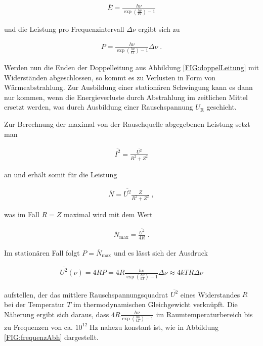 \begin{align}
\overline{E} = \frac{h\nu}{\exp\left( \frac{h\nu}{kT}\right) -1}
\end{align}

und die Leistung pro Frequenzintervall $\Delta\nu$ ergibt sich zu

\begin{align}
P = \frac{h\nu}{\exp\left( \frac{h\nu}{kT}\right) -1}\Delta\nu \;.
\end{align}

Werden nun die Enden der Doppelleitung aus Abbildung \ref{FIG:doppelLeitung} mit Widerständen abgeschlossen, so kommt es zu Verlusten in Form von Wärmeabstrahlung. Zur Ausbildung einer stationären Schwingung kann es dann nur kommen, wenn die Energieverluste durch Abstrahlung im zeitlichen Mittel ersetzt werden, was durch Ausbildung einer Rauschspannung $U_{\textrm{R}}$ geschieht.

Zur Berechnung der maximal von der Rauschquelle abgegebenen Leistung setzt man 

\begin{align}
\overline{I^2} = \frac{\overline{U^2}}{R^2+Z^2}
\end{align}

an und erhält somit für die Leistung 

\begin{align}
\overline{N} = \overline{U^2} \frac{Z}{R^2+Z^2} \;,
\end{align}

was im Fall $R = Z$ maximal wird mit dem Wert 

\begin{align}
\overline{N}_{\textrm{max}} = \frac{ \overline{U^2} }{4R} \; .
\end{align}

Im stationären Fall folgt $P = \overline{N}_{\textrm{max}}$ und es lässt sich der Ausdruck

\begin{align}
\overline{U^2}(\nu) = 4RP = 4R \frac{h\nu}{\exp\left( \frac{h\nu}{kT}\right) -1 } \Delta\nu \approx 4kTR\Delta\nu 
\end{align}

aufstellen, der das mittlere Rauschspannungsquadrat $ \overline{U^2}$ eines Widerstandes $R$ bei der Temperatur $T$ im thermodynamischen Gleichgewicht verknüpft. Die Näherung ergibt sich daraus, dass $ 4R \frac{h\nu}{\exp\left( \frac{h\nu}{kT}\right) -1 }$ im Raumtemperaturbereich bis zu Frequenzen von ca. $10^{12}\;$Hz nahezu konstant ist, wie in Abbildung \ref{FIG:frequenzAbh} dargestellt. 

